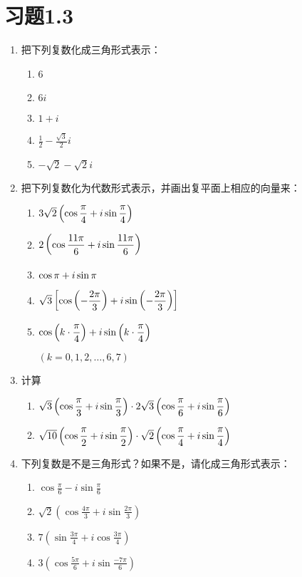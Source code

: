 \section*{习题1.3}
\begin{enumerate}
    \item 把下列复数化成三角形式表示：
\begin{multicols}{3}
\begin{enumerate}[(1)]
    \item 6
    \item $6i$
    \item $1+i$
    \item $\frac{1}{2}-\frac{\sqrt{3}}{2}i$
    \item $-\sqrt{2}-\sqrt{2}i$
\end{enumerate}
\end{multicols}

\item 把下列复数化为代数形式表示，并画出复平面上相应的向量来：
\begin{multicols}{2}
\begin{enumerate}[(1)]
    \item $3\sqrt{2}\left(\cos{\dfrac{\pi}{4}}+i\sin{\dfrac{\pi}{4}}\right)$
    \item $2\left(\cos{\dfrac{11\pi}{6}}+i\sin{\dfrac{11\pi}{6}}\right)$
    \item $\cos{\pi}+i\sin{\pi}$
    \item $\sqrt{3}\left[\cos\left(-\dfrac{2\pi}{3}\right)+i\sin\left(-\dfrac{2\pi}{3}\right)\right]$
    \item $\cos\left(k\cdot \dfrac{\pi}{4}\right)+i\sin\left(k\cdot \dfrac{\pi}{4}\right)$
    
    $(k=0,1,2,\ldots,6,7)$
\end{enumerate}
\end{multicols}

\item 计算
\begin{enumerate}[(1)]
    \item $\sqrt{3}\left(\cos{\dfrac{\pi}{3}}+i\sin{\dfrac{\pi}{3}}\right)\cdot 2\sqrt{3}\left(\cos{\dfrac{\pi}{6}}+i\sin{\dfrac{\pi}{6}}\right)$
    \item $\sqrt{10}\left(\cos{\dfrac{\pi}{2}}+i\sin{\dfrac{\pi}{2}}\right)\cdot \sqrt{2}\left(\cos{\dfrac{\pi}{4}}+i\sin{\dfrac{\pi}{4}}\right)$
\end{enumerate}

\item 下列复数是不是三角形式？如果不是，请化成三角形式表示：
\begin{multicols}{2}
\begin{enumerate}[(1)]
    \item $\cos\frac{\pi}{6}-i\sin\frac{\pi}{6}$
    \item $\sqrt{2}\left(\cos\frac{4\pi}{3}+i\sin\frac{2\pi}{3}\right)$
    \item $7\left(\sin\frac{3\pi}{4}+i\cos\frac{3\pi}{4}\right)$
    \item $3\left(\cos\frac{5\pi}{6}+i\sin\frac{-7\pi}{6}\right)$
\end{enumerate}
\end{multicols}


\end{enumerate}
